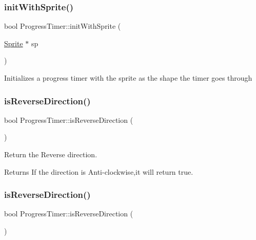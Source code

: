 \subsubsection{\texorpdfstring{init\+With\+Sprite()}{initWithSprite()}\hspace{0.1cm}{\footnotesize\ttfamily [2/2]}}
{\footnotesize\ttfamily bool Progress\+Timer\+::init\+With\+Sprite (\begin{DoxyParamCaption}\item[{\hyperlink{classSprite}{Sprite} $\ast$}]{sp }\end{DoxyParamCaption})}

Initializes a progress timer with the sprite as the shape the timer goes through \mbox{\label{classProgressTimer_a97b759861d5e2e32ff94833f23e24eb7}} 
\subsubsection{\texorpdfstring{is\+Reverse\+Direction()}{isReverseDirection()}\hspace{0.1cm}{\footnotesize\ttfamily [1/2]}}
{\footnotesize\ttfamily bool Progress\+Timer\+::is\+Reverse\+Direction (\begin{DoxyParamCaption}{ }\end{DoxyParamCaption})\hspace{0.3cm}{\ttfamily [inline]}}

Return the Reverse direction.

\begin{DoxyReturn}{Returns}
If the direction is Anti-\/clockwise,it will return true. 
\end{DoxyReturn}
\mbox{\label{classProgressTimer_a97b759861d5e2e32ff94833f23e24eb7}} 
\subsubsection{\texorpdfstring{is\+Reverse\+Direction()}{isReverseDirection()}\hspace{0.1cm}{\footnotesize\ttfamily [2/2]}}
{\footnotesize\ttfamily bool Progress\+Timer\+::is\+Reverse\+Direction (\begin{DoxyParamCaption}{ }\end{DoxyParamCaption})\hspace{0.3cm}{\ttfamily [inline]}}

